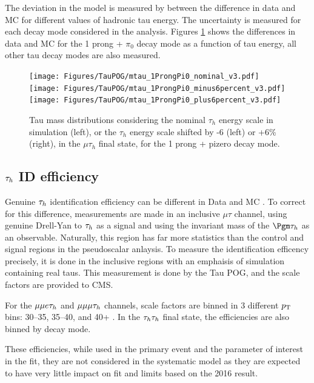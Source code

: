 The deviation in the model is measured by between the difference in data and MC for different values of hadronic tau energy. The uncertainty is measured for each decay mode considered in the analysis. Figures \ref{fig:taues} shows the differences in data and MC for the 1 prong + $\pi_0$ decay mode as a function of tau energy, all other tau decay modes are also measured. 

\begin{figure}[h!]
    \begin{center}
        \texttt{[image: Figures/TauPOG/mtau\_1ProngPi0\_nominal\_v3.pdf]}
        \texttt{[image: Figures/TauPOG/mtau\_1ProngPi0\_minus6percent\_v3.pdf]}
        \texttt{[image: Figures/TauPOG/mtau\_1ProngPi0\_plus6percent\_v3.pdf]}
    \end{center}
    \caption{Tau mass distributions considering the nominal $\tau_h$ energy scale in simulation (left), or the $\tau_h$ energy scale shifted by -6 (left) or +6\% (right), in the $\mu\tau_h$ final state, for the 1 prong + pizero decay mode.}
    \label{fig:taues}
\end{figure}

\subsection{$\tau_h$ ID efficiency}

Genuine $\tau_h$ identification efficiency can be different in Data and MC \cite{TAUIDTwiki}. To correct for this difference, measurements are 
made in an inclusive $\mu\tau$ channel, using genuine Drell-Yan to $\tau_h$ as a signal and using the invariant mass
of the $\Pgm\tauh$ as an observable. Naturally, this region has far more statistics than the control and signal regions in the pseudoscalar anlaysis. To measure the identification efficency precisely, it is done in the inclusive regions with an emphaisis of simulation containing real taus. This measurement is done by the Tau POG, and the scale factors are provided to CMS. 

For the $\mu\mu e \tau_h$ and $\mu\mu\mu\tau_h$ channels, scale factors are binned in 3 different $p_{\mathrm{T}}$ bins: 30--35, 35--40, and 40+ \GeV. In the $\tau_h\tau_h$ final state, the efficiencies are also binned by decay mode. 


These efficiencies, while used in the primary event and the parameter of interest in the fit, they are not considered in the systematic model as they are expected to have very little impact on fit and limits based on the 2016 result. 


